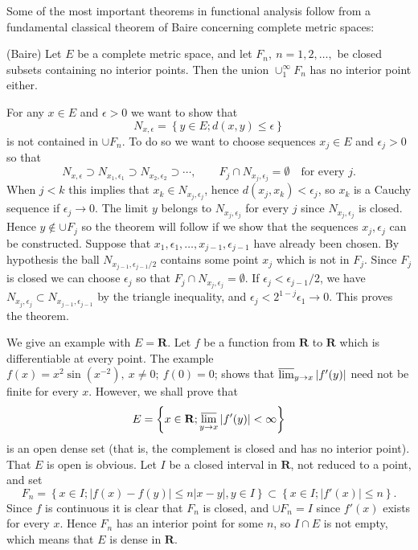Some of the most important theorems in functional analysis follow from
a fundamental classical theorem of Baire concerning complete metric
spaces:
\begin{thm}\label{thm:2.1.1}
  (Baire) Let $E$ be a complete metric space, and let $F_n,\ 
  n=1,2,\dots,$ be closed subsets containing no interior points. Then
  the union $\cup_1^{\infty}F_n$ has no interior point either.
\end{thm}
\begin{prf}
  For any $x\in E$ and $\epsilon>0$ we want to show that
  \begin{displaymath}
    N_{x,\epsilon} = \left\{ y\in E;d(x,y)\leq\epsilon \right\}
  \end{displaymath}
is not contained in $\cup F_n$. To do so we want to choose sequences
$x_j\in E$ and $\epsilon_j>0$ so that
\begin{displaymath}
  N_{x,\epsilon}\supset N_{x_1,\epsilon_1}\supset
  N_{x_2,\epsilon_2}\supset\cdots,\qquad F_j\cap
  N_{x_j,\epsilon_j}=\emptyset \quad \text{for every } j.
\end{displaymath}
When $j<k$ this implies that $x_k\in N_{x_j,\epsilon_j}$, hence
$d(x_j,x_k)<\epsilon_j$, so $x_k$ is a Cauchy sequence if
$\epsilon_j\to 0$. The limit $y$ belongs to $N_{x_j,\epsilon_j}$ for
every $j$ since $N_{x_j,\epsilon_j}$ is closed. Hence $y\notin\cup
F_j$ so the theorem will follow if we show that the sequences
$x_j,\epsilon_j$ can be constructed. Suppose that
$x_1,\epsilon_1,\dots,x_{j-1},\epsilon_{j-1}$ have already been
chosen. By hypothesis the ball $N_{x_{j-1},\epsilon_{j-1}/2}$ contains
some point $x_j$ which is not in $F_j$. Since $F_j$ is closed we can
choose $\epsilon_j$ so that $F_j\cap N_{x_j,\epsilon_j}=\emptyset$. If
$\epsilon_j<\epsilon_{j-1}/2$, we have $N_{x_j,\epsilon_j}\subset
N_{x_{j-1},\epsilon_{j-1}}$ by the triangle inequality, and
$\epsilon_j<2^{1-j}\epsilon_1\to 0$. This proves the theorem.
\end{prf}
\begin{exa}
  We give an example with $E=\mathbf{R}$. Let $f$ be a function from
  $\mathbf{R}$ to $\mathbf{R}$ which is differentiable at every
  point. The example $f(x)=x^2\sin(x^{-2}),\ x\neq0;\ f(0)=0$; shows
  that $\varlimsup_{y\to x}|f'(y)|$ need not be finite for every
  $x$. However, we shall prove that
  \begin{displaymath}
    E=\left\{ x\in\mathbf{R};\varlimsup_{y\to x}|f'(y)|<\infty \right\}
  \end{displaymath}
is an open dense set (that is, the complement is closed and has no
interior point). That $E$ is open is obvious. Let $I$ be a closed
interval in $\mathbf{R}$, not reduced to a point, and set
\begin{displaymath}
  F_n=\left\{ x\in I;|f(x)-f(y)|\leq n|x-y|,y\in I \right\}\subset
  \left\{ x\in I;|f'(x)|\leq n \right\}.
\end{displaymath}
Since $f$ is continuous it is clear that $F_n$ is closed, and $\cup
F_n=I$ since $f'(x)$ exists for every $x$. Hence $F_n$ has an interior
point for some $n$, so $I\cap E$ is not empty, which means that $E$ is
dense in $\mathbf{R}$.
\end{exa}
